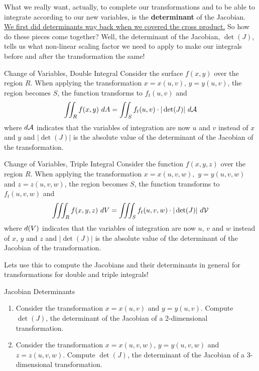 What we really want, actually, to complete our transformations and to be able to integrate according to our new variables, is the \textbf{determinant} of the Jacobian. \hyperlink{det}{We first did determinants way back when we covered the cross product.} So how do these pieces come together? Well, the determinant of the Jacobian, $\det(J)$, tells us what non-linear scaling factor we need to apply to make our integrals before and after the transformation the same!

\begin{claim}{Change of Variables, Double Integral}
Consider the surface $f(x,y)$ over the region $R$. When applying the transformation $x=x(u,v)$, $y=y(u,v)$, the region becomes $S$, the function transforms to $f_t(u,v)$ and $$\iint_R f(x,y)\ dA=\iint_S f_t(u,v)\cdot |\det(J)|\ d\mathcal{A} $$ where $d\mathcal{A}$ indicates that the variables of integration are now $u$ and $v$ instead of $x$ and $y$ and $|\det(J)|$ is the absolute value of the determinant of the Jacobian of the transformation.
\end{claim}

\begin{claim}{Change of Variables, Triple Integral}
Consider the function $f(x,y,z)$ over the region $R$. When applying the transformation $x=x(u,v,w),$ $y=y(u,v,w)$ and $z=z(u,v,w)$, the region becomes $S$, the function transforms to $f_t(u,v,w)$ and $$\iiint_R f(x,y,z)\ dV=\iiint_S f_t(u,v,w)\cdot |\det(J)| \ d\mathcal{V} $$ where $d\mathcal(V)$ indicates that the variables of integration are now $u$, $v$ and $w$ instead of $x$, $y$ and $z$ and $|\det(J)|$ is the absolute value of the determinant of the Jacobian of the transformation.
\end{claim}

Lets use this to compute the Jacobians and their determinants in general for transformations for double and triple integrals!

\begin{exercise}{Jacobian Determinants}
\begin{enumerate}
\item Consider the transformation $x=x(u,v)$ and $y=y(u,v)$. Compute $\det(J)$, the determinant of the Jacobian of a 2-dimensional transformation. 
\vspace{1em}
\item Consider the transformation $x=x(u,v,w)$, $y=y(u,v,w)$ and $z=z(u,v,w)$. Compute $\det(J)$, the determinant of the Jacobian of a 3-dimensional transformation.
\end{enumerate}
\end{exercise}

